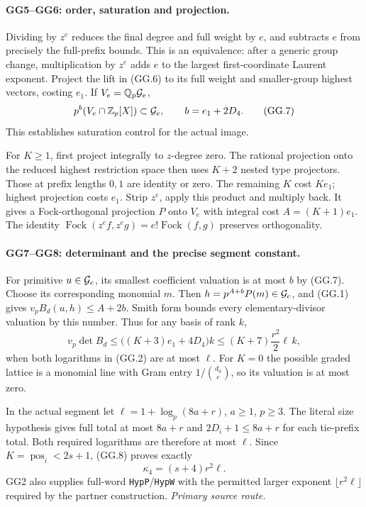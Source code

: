 \documentclass[11pt,a4paper]{article}
\numberwithin{equation}{section}
\theoremstyle{remark}\newtheorem{remark}[theorem]{Remark}
\begin{document}
\paragraph{GG5--GG6: order, saturation and projection.}
Dividing by $z^e$ reduces the final degree and full weight by $e$,
and subtracts $e$ from precisely the full-prefix bounds.
This is an equivalence: after a generic group change, multiplication
by $z^e$ adds $e$ to the largest first-coordinate Laurent exponent.
Project the lift in (GG.6) to its full weight and smaller-group
highest vectors, costing $e_1$. If $V_e=\mathbb Q_p{\cal G}_e$,
\[
 p^b(V_e\cap\mathbb Z_p[X])\subset{\cal G}_e,\qquad
 b=e_1+2D_4.                                                   \tag{GG.7}
\]
This establishes saturation control for the actual image.

For $K\ge1$, first project integrally to $z$-degree zero. The rational
projection onto the reduced highest restriction space then uses
$K+2$ nested type projectors. Those at prefix
lengths $0,1$ are identity or zero. The remaining $K$ cost $Ke_1$;
highest projection costs $e_1$. Strip $z^e$, apply this product and
multiply back. It gives a Fock-orthogonal projection $P$ onto $V_e$
with integral cost $A=(K+1)e_1$. The identity
$\operatorname{Fock}(z^ef,z^eg)=e!\operatorname{Fock}(f,g)$
preserves orthogonality.

\paragraph{GG7--GG8: determinant and the precise segment constant.}
For primitive $u\in{\cal G}_e$, its smallest coefficient valuation
is at most $b$ by (GG.7). Choose its corresponding monomial $m$.
Then $h=p^{A+b}P(m)\in{\cal G}_e$, and (GG.1) gives
$v_pB_d(u,h)\le A+2b$.
Smith form bounds every elementary-divisor valuation by this number.
Thus for any basis of rank $k$,
\[
 v_p\det B_d\le\bigl((K+3)e_1+4D_4\bigr)k
 \le (K+7)\frac{r^2}{2}\ell\,k,                                \tag{GG.8}
\]
when both logarithms in (GG.2) are at most $\ell$.
For $K=0$ the possible graded lattice is a monomial line with Gram
entry $1/\binom{d_0}{e}$, so its valuation is at most zero.

In the actual segment let $\ell=1+\log_p(8a+r)$, $a\ge1$, $p\ge3$.
The literal size hypothesis gives full total at most $8a+r$ and
$2D_i+1\le8a+r$ for each tie-prefix total.
Both required logarithms are therefore at most $\ell$.
Since $K=\operatorname{pos}_i<2s+1$, (GG.8) proves exactly
\[
 \kappa_4=(s+4)r^2\ell.                                       \tag{GG.9}
\]
GG2 also supplies full-word \texttt{HypP}/\texttt{HypW} with the
permitted larger exponent $\lfloor r^2\ell\rfloor$ required by
the partner construction.
\noindent\textit{Primary source route.}\cite{graded-gram-actual}
\end{document}
